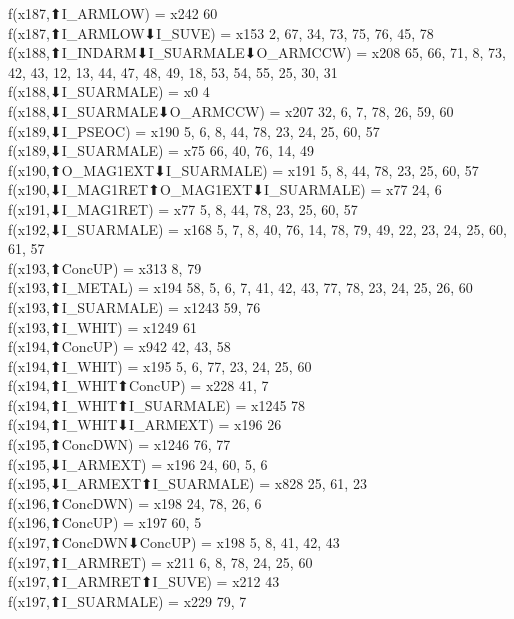 f(x187,⬆I_ARMLOW) = x242 {60} \\
f(x187,⬆I_ARMLOW⬇I_SUVE) = x153 {2, 67, 34, 73, 75, 76, 45, 78} \\
f(x188,⬆I_INDARM⬇I_SUARMALE⬇O_ARMCCW) = x208 {65, 66, 71, 8, 73, 42, 43, 12, 13, 44, 47, 48, 49, 18, 53, 54, 55, 25, 30, 31} \\
f(x188,⬇I_SUARMALE) = x0 {4} \\
f(x188,⬇I_SUARMALE⬇O_ARMCCW) = x207 {32, 6, 7, 78, 26, 59, 60} \\
f(x189,⬇I_PSEOC) = x190 {5, 6, 8, 44, 78, 23, 24, 25, 60, 57} \\
f(x189,⬇I_SUARMALE) = x75 {66, 40, 76, 14, 49} \\
f(x190,⬆O_MAG1EXT⬇I_SUARMALE) = x191 {5, 8, 44, 78, 23, 25, 60, 57} \\
f(x190,⬇I_MAG1RET⬆O_MAG1EXT⬇I_SUARMALE) = x77 {24, 6} \\
f(x191,⬇I_MAG1RET) = x77 {5, 8, 44, 78, 23, 25, 60, 57} \\
f(x192,⬇I_SUARMALE) = x168 {5, 7, 8, 40, 76, 14, 78, 79, 49, 22, 23, 24, 25, 60, 61, 57} \\
f(x193,⬆ConcUP) = x313 {8, 79} \\
f(x193,⬆I_METAL) = x194 {58, 5, 6, 7, 41, 42, 43, 77, 78, 23, 24, 25, 26, 60} \\
f(x193,⬆I_SUARMALE) = x1243 {59, 76} \\
f(x193,⬆I_WHIT) = x1249 {61} \\
f(x194,⬆ConcUP) = x942 {42, 43, 58} \\
f(x194,⬆I_WHIT) = x195 {5, 6, 77, 23, 24, 25, 60} \\
f(x194,⬆I_WHIT⬆ConcUP) = x228 {41, 7} \\
f(x194,⬆I_WHIT⬆I_SUARMALE) = x1245 {78} \\
f(x194,⬆I_WHIT⬇I_ARMEXT) = x196 {26} \\
f(x195,⬆ConcDWN) = x1246 {76, 77} \\
f(x195,⬇I_ARMEXT) = x196 {24, 60, 5, 6} \\
f(x195,⬇I_ARMEXT⬆I_SUARMALE) = x828 {25, 61, 23} \\
f(x196,⬆ConcDWN) = x198 {24, 78, 26, 6} \\
f(x196,⬆ConcUP) = x197 {60, 5} \\
f(x197,⬆ConcDWN⬇ConcUP) = x198 {5, 8, 41, 42, 43} \\
f(x197,⬆I_ARMRET) = x211 {6, 8, 78, 24, 25, 60} \\
f(x197,⬆I_ARMRET⬆I_SUVE) = x212 {43} \\
f(x197,⬆I_SUARMALE) = x229 {79, 7} \\
